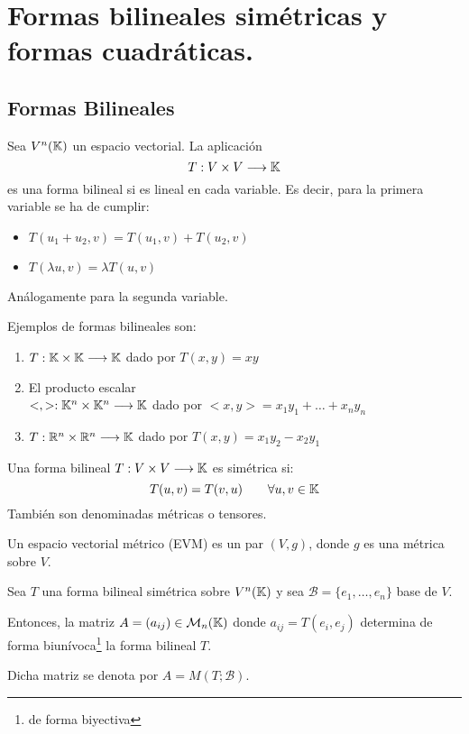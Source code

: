 \chapter{Formas bilineales simétricas y formas cuadráticas.}

\section{Formas Bilineales}
\begin{definicion}
Sea $V^n(\mathbb{K})$ un espacio vectorial. La aplicación
$$T:V\times V \longrightarrow \mathbb{K}$$ es una forma bilineal si es lineal en cada variable. Es decir, para la primera variable se ha de cumplir:
\begin{itemize}
    \item $T(u_1+u_2,v) = T(u_1,v) + T(u_2, v)$
    \item $T(\lambda u,v) = \lambda T(u,v)$
\end{itemize}
Análogamente para la segunda variable.
\begin{ejemplo} Ejemplos de formas bilineales son:
\begin{enumerate}
    \item $T:\mathbb{K} \times \mathbb{K} \longrightarrow \mathbb{K}$ dado por $T(x,y) = xy$
    
    \item El producto escalar\\
    $<,>:\mathbb{K}^n \times \mathbb{K}^n \longrightarrow \mathbb{K}$ dado por $<x,y> = x_1y_1 + \dots + x_ny_n$

    \item $T:\mathbb{R}^n \times \mathbb{R}^n \longrightarrow \mathbb{K}$ dado por $T(x,y) = x_1y_2 - x_2y_1$
\end{enumerate}
\end{ejemplo}
\end{definicion}

\begin{definicion}
    Una forma bilineal $T:V\times V \longrightarrow \mathbb{K}$ es simétrica si:
    $$T(u,v) = T(v,u) \qquad \forall u,v \in \mathbb{K}$$
    También son denominadas métricas o tensores.
\end{definicion}

\begin{definicion}[EVM]
    Un espacio vectorial métrico (EVM) es un par $(V,g)$, donde $g$ es una métrica sobre $V$.
\end{definicion}

\begin{teo}
    Sea $T$ una forma bilineal simétrica sobre $V^n(\mathbb{K})$ y sea $\mathcal{B}=\{e_1, \dots, e_n\}$ base de $V$.

    Entonces, la matriz $A=(a_{ij})\in \mathcal{M}_n(\mathbb{K})$ donde $a_{ij}=T(e_i, e_j)$ determina de forma biunívoca\footnote{de forma biyectiva} la forma bilineal $T$.

    Dicha matriz se denota por $A=M(T; \mathcal{B})$.
\end{teo}

